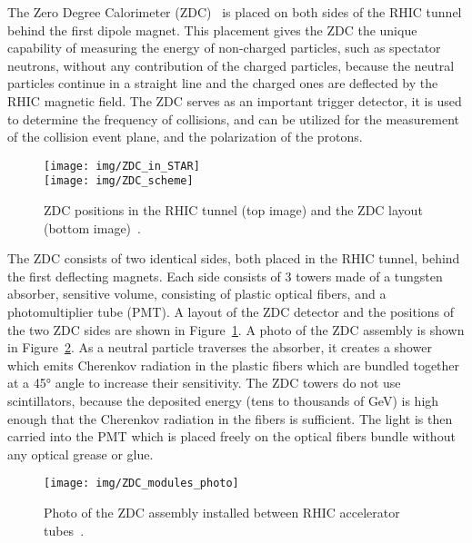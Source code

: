 The Zero Degree Calorimeter (ZDC)~\cite{ZDC, ZDCSMD} is placed on both sides of the RHIC tunnel behind the first dipole magnet. This placement gives the ZDC the unique capability of measuring the energy of non-charged particles, such as spectator neutrons, without any contribution of the charged particles, because the neutral particles continue in a straight line and the charged ones are deflected by the RHIC magnetic field. The ZDC serves as an important trigger detector, it is used
to determine the frequency of collisions, and can be utilized for the measurement of the collision event plane, and the polarization of the protons.

\begin{figure}[!htb]
\begin{center}
  \texttt{[image: img/ZDC\_in\_STAR]}\\
  \texttt{[image: img/ZDC\_scheme]}
\end{center}
\caption[ZDC positions in the RHIC tunnel and the ZDC layout.]{\label{ZDC_scheme}ZDC positions in the RHIC tunnel (top image) and the ZDC layout (bottom image)~\cite{ZDCSMD}. }
\end{figure}


The ZDC consists of two identical sides, both placed in the RHIC tunnel, behind 
the first deflecting magnets. Each side consists of 3 towers made of a tungsten absorber, sensitive volume, consisting of plastic optical fibers, and a photomultiplier tube (PMT)\@. A layout of the ZDC detector and the positions of the two ZDC sides are shown in Figure~\ref{ZDC_scheme}\@. A photo of the ZDC assembly is shown in Figure~\ref{ZDC_photo}\@. As a neutral particle traverses the absorber, it creates a shower which emits Cherenkov radiation in the plastic fibers which are bundled together at a 45° angle to increase their sensitivity. The ZDC towers do not use scintillators, because the deposited energy (tens to thousands of GeV) is high enough that the Cherenkov radiation in the fibers is sufficient. The light is then carried into the PMT which is placed freely on the optical fibers bundle without any optical grease or glue.

\begin{figure}[!htb]
\begin{center}
  \texttt{[image: img/ZDC\_modules\_photo]}
\end{center}
\caption[Photo of the ZDC assembly installed between RHIC accelerator tubes.]{\label{ZDC_photo}Photo of the ZDC assembly installed between RHIC accelerator tubes~\cite{ZDCSMD}. }
\end{figure}

